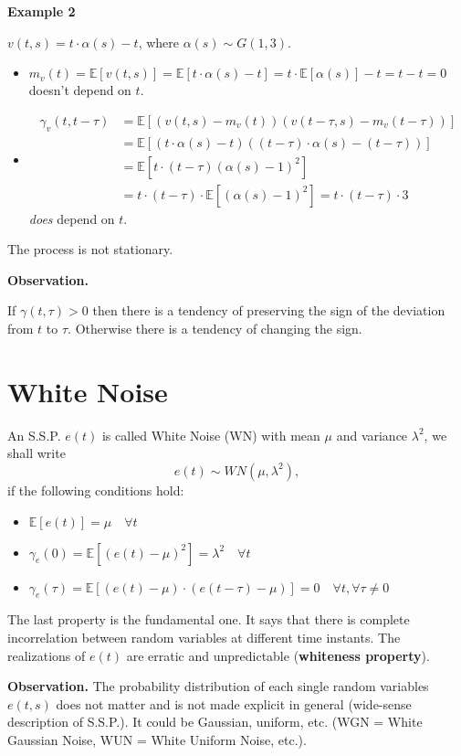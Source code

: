 \documentclass[10pt,a4paper,twoside,openright]{book}
\begin{document}
\textbf{Example 2}

$v(t, s)=t \cdot \alpha(s)-t$, where $\alpha(s) \sim G(1,3)$.
\begin{itemize}
	\item $m_{v}(t)=\mathbb{E}[v(t, s)]=\mathbb{E}[t \cdot \alpha(s)-t]=t \cdot \mathbb{E}[\alpha(s)]-t=t-t=0$ doesn't depend on $t$.
	\item \begin{align*}
		\gamma_{v}(t, t-\tau)&=\mathbb{E}[(v(t, s)-m_{v}(t))(v(t-\tau, s)-m_{v}(t-\tau))]\\
	&=\mathbb{E}[(t \cdot \alpha(s)-t)((t-\tau) \cdot \alpha(s)-(t-\tau))]\\
	&=\mathbb{E}[t \cdot(t-\tau)(\alpha(s)-1)^{2}]\\
	&=t \cdot(t-\tau) \cdot \mathbb{E}[(\alpha(s)-1)^{2}]=t \cdot(t-\tau) \cdot 3
	\end{align*}
	\emph{does} depend on $t$.
\end{itemize}
The process is not stationary.

\textbf{Observation.}

If $\gamma(t, \tau)>0$ then there is a tendency of preserving the sign of the deviation from $t$ to $\tau $. Otherwise there is a tendency of changing the sign.

\section{White Noise}

An S.S.P. $e(t)$ is called White Noise (WN) with mean $\mu$ and variance $\lambda^{2}$, we shall write
\[
	e(t) \sim W N(\mu, \lambda^{2}),
\]
if the following conditions hold:
\begin{itemize}
	\item $\mathbb{E}[e(t)]=\mu \quad \forall t$
	\item $\gamma_{e}(0)=\mathbb{E}[(e(t)-\mu)^{2}]=\lambda^{2} \quad \forall t$
	\item $\gamma_{e}(\tau)=\mathbb{E}[(e(t)-\mu) \cdot(e(t-\tau)-\mu)]=0 \quad \forall t, \forall \tau \neq 0$
\end{itemize}

The last property is the fundamental one. It says that there is complete incorrelation between random variables at different time instants. The realizations of $e(t)$ are erratic and unpredictable (\textbf{whiteness property}).


\textbf{Observation.} The probability distribution of each single random variables $e(t,s)$ does not matter and is not made explicit in general (wide-sense description of S.S.P.).
It could be Gaussian, uniform, etc. (WGN = White Gaussian Noise, WUN = White Uniform Noise, etc.).
\end{document}
